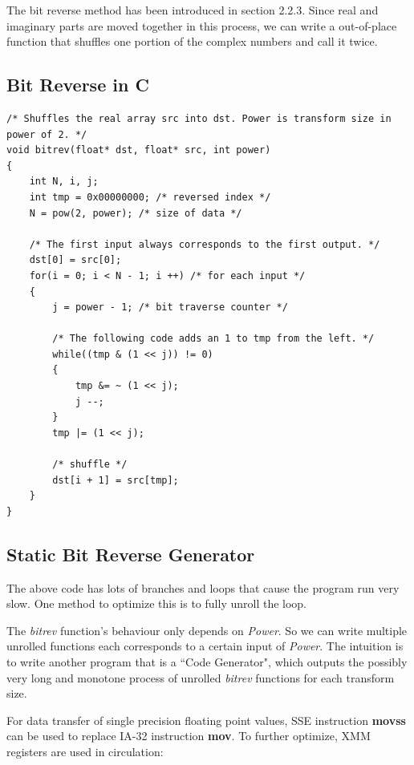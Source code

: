 \documentclass[a4paper]{report}
\begin{document}
	The bit reverse method has been introduced in section 2.2.3. Since real and imaginary parts are moved together in this process, we can write a out-of-place function that shuffles one portion of the complex numbers and call it twice.
	
\subsection{Bit Reverse in C} \indent

        \lstset{language = c, tabsize = 4}
        \begin{lstlisting}
/* Shuffles the real array src into dst. Power is transform size in power of 2. */
void bitrev(float* dst, float* src, int power)
{
    int N, i, j;
    int tmp = 0x00000000; /* reversed index */
    N = pow(2, power); /* size of data */
    
    /* The first input always corresponds to the first output. */
    dst[0] = src[0];
    for(i = 0; i < N - 1; i ++) /* for each input */
    {
        j = power - 1; /* bit traverse counter */
        
        /* The following code adds an 1 to tmp from the left. */
        while((tmp & (1 << j)) != 0)
        {
            tmp &= ~ (1 << j);
            j --;
        }
        tmp |= (1 << j);
        
        /* shuffle */
        dst[i + 1] = src[tmp];
    }
}
        \end{lstlisting}

\subsection{Static Bit Reverse Generator} \indent

	The above code has lots of branches and loops that cause the program run very slow. One method to optimize this is to fully unroll the loop.
	
	The \textit{bitrev} function's behaviour only depends on \textit{Power}. So we can write multiple unrolled functions each corresponds to a certain input of \textit{Power}. The intuition is to write another program that is a ``Code Generator", which outputs the possibly very long and monotone process of unrolled \textit{bitrev} functions for each transform size.
	
	For data transfer of single precision floating point values, SSE instruction \textbf{movss} can be used to replace IA-32 instruction \textbf{mov}. To further optimize, XMM registers are used in circulation:
\end{document}

